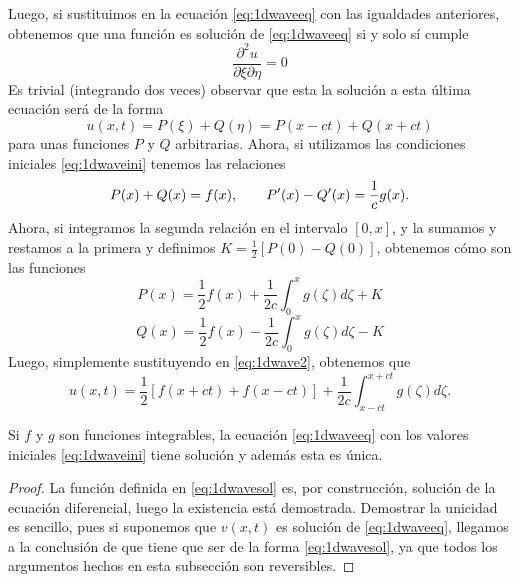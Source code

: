 Luego, si sustituimos en la ecuación \ref{eq:1dwaveeq} con las igualdades anteriores, obtenemos que una función es solución de \ref{eq:1dwaveeq} si y solo sí cumple
\begin{equation*}
	\frac{\partial^2 u}{\partial\xi\partial\eta} = 0
\end{equation*}
Es trivial (integrando dos veces) observar que esta la solución a esta última ecuación será de la forma
\begin{equation}
	\label{eq:1dwave2}
	u(x,t) = P(\xi) + Q(\eta) = P(x-ct) + Q(x+ct)
\end{equation}
para unas funciones $P$ y $Q$ arbitrarias.
Ahora, si utilizamos las condiciones iniciales \ref{eq:1dwaveini} tenemos las relaciones
\begin{equation*}
	P(x) + Q(x) = f(x), \hspace{20px} P'(x) - Q'(x) = \frac{1}{c}g(x). 
\end{equation*}
Ahora, si integramos la segunda relación en el intervalo $[0,x]$, y la sumamos y restamos a la primera y definimos $K=\frac{1}{2}[P(0)-Q(0)]$, obtenemos cómo son las funciones
\begin{equation*}
	P(x) = \frac{1}{2}f(x) + \frac{1}{2c}\int_{0}^{x}g(\zeta)d\zeta + K
\end{equation*}
\begin{equation*}
	Q(x) = \frac{1}{2}f(x) - \frac{1}{2c}\int_{0}^{x}g(\zeta)d\zeta - K
\end{equation*}
Luego, simplemente sustituyendo en \ref{eq:1dwave2}, obtenemos que
\begin{equation}
	\label{eq:1dwavesol}
	u(x,t) = \frac{1}{2}[f(x+ct)+f(x-ct)] + \frac{1}{2c}\int_{x-ct}^{x+ct}g(\zeta)d\zeta.
\end{equation}
\begin{teorema}
	Si $f$ y $g$ son funciones integrables, la ecuación \ref{eq:1dwaveeq} con los valores iniciales \ref{eq:1dwaveini} tiene solución y además esta es única.
\end{teorema}
\begin{proof}
 	La función definida en \ref{eq:1dwavesol} es, por construcción, solución de la ecuación diferencial, luego la existencia está demostrada.
 	Demostrar la unicidad es sencillo, pues si suponemos que $v(x,t)$ es solución de \ref{eq:1dwaveeq}, llegamos a la conclusión de que tiene que ser de la forma \ref{eq:1dwavesol}, ya que todos los argumentos hechos en esta subsección son reversibles. 
\end{proof}

